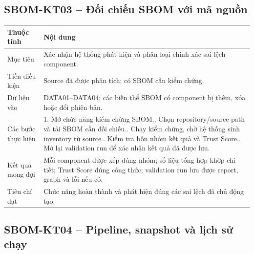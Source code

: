 \documentclass[12pt,a4paper]{article}
\begin{document}
\subsection{SBOM-KT03 -- Đối chiếu SBOM với mã nguồn}

\begin{longtable}{|L{3.4cm}|L{11.2cm}|}
  \hline
  \textbf{Thuộc tính} & \textbf{Nội dung} \\ \hline
  Mục tiêu & Xác nhận hệ thống phát hiện và phân loại chính xác sai lệch component. \\ \hline
  Tiền điều kiện & Source đã được phân tích; có SBOM cần kiểm chứng. \\ \hline
  Dữ liệu vào & DATA01--DATA04; các biến thể SBOM có component bị thêm, xóa hoặc đổi phiên bản. \\ \hline
  Các bước thực hiện &
  1. Mở chức năng kiểm chứng SBOM.. Chọn repository/source path và tải SBOM cần đối chiếu.. Chạy kiểm chứng, chờ hệ thống sinh inventory từ source.. Kiểm tra bốn nhóm kết quả và Trust Score.. Mở lại validation run để xác nhận kết quả đã được lưu. \\ \hline
  Kết quả mong đợi & Mỗi component được xếp đúng nhóm; số liệu tổng hợp khớp chi tiết;
  Trust Score đúng công thức; validation run lưu được report, graph và lỗi nếu có. \\ \hline
  Tiêu chí đạt & Chức năng hoàn thành và phát hiện đúng các sai lệch đã chủ động tạo. \\ \hline
\end{longtable}

\subsection{SBOM-KT04 -- Pipeline, snapshot và lịch sử chạy}
\end{document}
